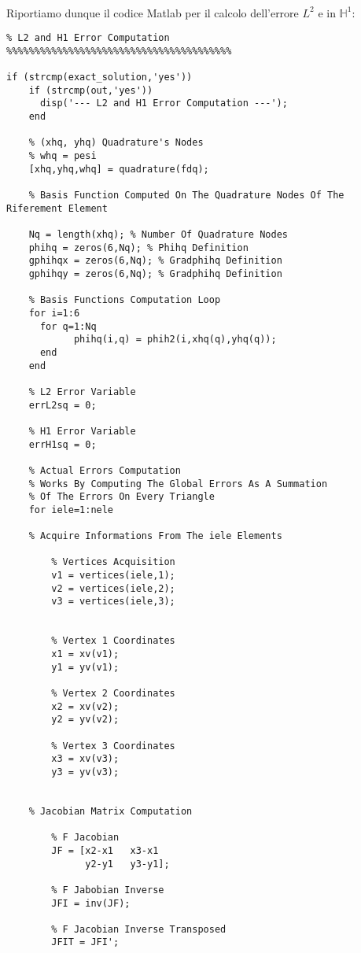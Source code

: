 \documentclass[12pt,a4paper]{report}
\theoremstyle{theorem}
\theoremstyle{theorem}
\theoremstyle{definition}
\begin{document}
\hfill \\
Riportiamo dunque il codice Matlab per il calcolo dell'errore $L^2$ e in $\mathbb{H}^{1}$:
\begin{lstlisting}[caption=Errore $L^2$ e $\mathbb{H}^1$, style=matlab]
%%%%%%%%%%%%%%%%%%%%%%%%%%%%%%%%%%%%%%%%
% L2 and H1 Error Computation
%%%%%%%%%%%%%%%%%%%%%%%%%%%%%%%%%%%%%%%%

if (strcmp(exact_solution,'yes'))
    if (strcmp(out,'yes'))
      disp('--- L2 and H1 Error Computation ---');
    end
    
    % (xhq, yhq) Quadrature's Nodes
    % whq = pesi
    [xhq,yhq,whq] = quadrature(fdq);

    % Basis Function Computed On The Quadrature Nodes Of The Riferement Element

    Nq = length(xhq); % Number Of Quadrature Nodes
    phihq = zeros(6,Nq); % Phihq Definition
    gphihqx = zeros(6,Nq); % Gradphihq Definition
    gphihqy = zeros(6,Nq); % Gradphihq Definition

    % Basis Functions Computation Loop
    for i=1:6
      for q=1:Nq
            phihq(i,q) = phih2(i,xhq(q),yhq(q));
      end
    end

    % L2 Error Variable
    errL2sq = 0;
    
    % H1 Error Variable
    errH1sq = 0;
    
    % Actual Errors Computation
    % Works By Computing The Global Errors As A Summation
    % Of The Errors On Every Triangle    
    for iele=1:nele
    
    % Acquire Informations From The iele Elements
    
        % Vertices Acquisition
        v1 = vertices(iele,1);
        v2 = vertices(iele,2);
        v3 = vertices(iele,3);
    
    
        % Vertex 1 Coordinates
        x1 = xv(v1);
        y1 = yv(v1);
    
        % Vertex 2 Coordinates
        x2 = xv(v2);
        y2 = yv(v2);
    
        % Vertex 3 Coordinates
        x3 = xv(v3);
        y3 = yv(v3);  
    
    
    % Jacobian Matrix Computation
 
        % F Jacobian
        JF = [x2-x1   x3-x1
              y2-y1   y3-y1]; 
           
        % F Jabobian Inverse
        JFI = inv(JF);
     
        % F Jacobian Inverse Transposed   
        JFIT = JFI';
        

\end{lstlisting}
\end{document}
